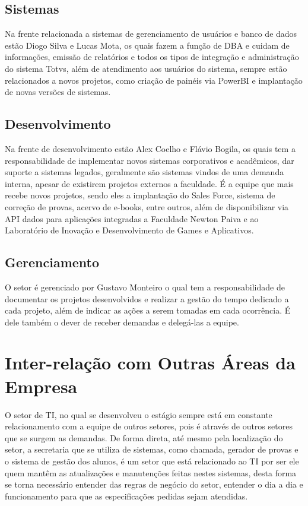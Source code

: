 \documentclass[
	12pt,				%
	oneside,			%
	a4paper,			%
	chapter=TITLE,		%
	section=TITLE,		%
	sumario=tradicional %
	english,			%
	french,				%
	spanish,			%
	brazil				%
	]{abntex2}
\begin{document}
\subsection{Sistemas}
Na frente relacionada a sistemas de gerenciamento de usuários e banco de dados estão Diogo Silva e Lucas Mota, os quais fazem a função de DBA  e cuidam de informações, emissão de relatórios e todos os tipos de integração e administração do sistema Totvs, além de atendimento aos usuários do sistema, sempre estão relacionados a novos projetos, como criação de painéis via PowerBI e implantação de novas versões de sistemas.

\subsection{Desenvolvimento}
Na frente de desenvolvimento estão Alex Coelho e Flávio Bogila, os quais tem a responsabilidade de implementar novos sistemas corporativos e acadêmicos, dar suporte a sistemas legados, geralmente são sistemas vindos de uma demanda interna, apesar de existirem projetos externos a faculdade. É a equipe que mais recebe novos projetos, sendo eles a implantação do Sales Force, sistema de correção de provas, acervo de e-books, entre outros, além de disponibilizar via API dados para aplicações integradas a Faculdade Newton Paiva e ao Laboratório de Inovação e Desenvolvimento de Games e Aplicativos.

\subsection{Gerenciamento}
O setor é gerenciado por Gustavo Monteiro o qual tem a responsabilidade de documentar os projetos desenvolvidos e realizar a gestão do tempo dedicado a cada projeto, além de indicar as ações a serem tomadas em cada ocorrência. É dele também o dever de receber demandas e delegá-las a equipe.

\section{Inter-relação com Outras Áreas da Empresa}
\label{sec:relacaoareas}

O setor de TI, no qual se desenvolveu o estágio sempre está em constante relacionamento com a equipe de outros setores, pois é através de outros setores que se surgem as demandas. De forma direta, até mesmo pela localização do setor, a secretaria que se utiliza de sistemas, como chamada, gerador de provas e o sistema de gestão dos alunos, é um setor que está relacionado ao TI por ser ele quem mantêm as atualizações e manutenções feitas nestes sistemas, desta forma se torna necessário entender das regras de negócio do setor, entender o dia a dia e funcionamento para que as especificações pedidas sejam atendidas.
\end{document}

